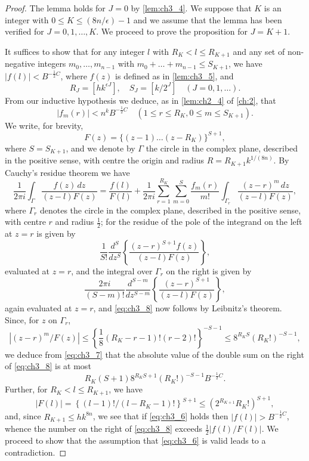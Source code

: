 \begin{proof}
The lemma holds for $J=0$ by \autoref{lem:ch3_4}. We suppose that $K$ is an integer with $0 \le K \le (8n/\epsilon) - 1$ and we assume that the lemma has been verified for $J=0,1,\dots,K$. We proceed to prove the proposition for $J=K+1$.

It suffices to show that for any integer $l$ with $R_K < l \le R_{K+1}$ and any set of non-negative integers $m_0, \dots, m_{n-1}$ with $m_0 + \dots + m_{n-1} \le S_{K+1}$, we have $|f(l)| < B^{-\frac{1}{2}C}$, where $f(z)$ is defined as in \autoref{lem:ch3_5}, and
\[
R_J = \left[hk^{\epsilon J}\right], \quad S_J = \left[k/2^J\right] \quad (J = 0, 1, \dots).
\]
From our inductive hypothesis we deduce, as in \autoref{lem:ch2_4} of \autoref{ch:2}, that
\begin{equation} \label{eq:ch3_7}\tag{7}
|f_m(r)| < n^k B^{-\frac{1}{2}C} \quad (1 \le r \le R_K, 0 \le m \le S_{K+1}).
\end{equation}
We write, for brevity,
\[
F(z) = \{(z-1) \dots (z-R_K)\}^{S+1},
\]
where $S = S_{K+1}$, and we denote by $\Gamma$ the circle in the complex plane, described in the positive sense, with centre the origin and radius $R = R_{K+1} k^{1/(8n)}$. By Cauchy's residue theorem we have
\begin{equation} \label{eq:ch3_8}\tag{8}
\frac{1}{2\pi i} \int_{\Gamma} \frac{f(z) \, dz}{(z-l) F(z)} = \frac{f(l)}{F(l)} + \frac{1}{2\pi i} \sum_{r=1}^{R_K} \sum_{m=0}^{S} \frac{f_m(r)}{m!} \int_{\Gamma_r} \frac{(z-r)^m \, dz}{(z-l) F(z)},
\end{equation}
where $\Gamma_r$ denotes the circle in the complex plane, described in the positive sense, with centre $r$ and radius $\frac{1}{2}$; for the residue of the pole of the integrand on the left at $z=r$ is given by
\[
\frac{1}{S!} \frac{d^S}{dz^S} \left\{ \frac{(z-r)^{S+1} f(z)}{(z-l) F(z)} \right\},
\]
evaluated at $z = r$, and the integral over $\Gamma_r$ on the right is given by
\[
\frac{2\pi i}{(S-m)!} \frac{d^{S-m}}{dz^{S-m}} \left\{ \frac{(z-r)^{S+1}}{(z-l)F(z)} \right\},
\]
again evaluated at $z = r$, and \eqref{eq:ch3_8} now follows by Leibnitz's theorem. Since, for $z$ on $\Gamma_r$,
\[
\left|(z-r)^m/F(z)\right| \le \left\{\frac{1}{8}(R_K-r-1)! (r-2)!\right\}^{-S-1} \le 8^{R_K S} (R_K!)^{-S-1},
\]
we deduce from \eqref{eq:ch3_7} that the absolute value of the double sum on the right of \eqref{eq:ch3_8} is at most
\[
R_K (S+1) 8^{R_K S+1} (R_K!)^{-S-1} B^{-\frac{1}{2}C}.
\]
Further, for $R_K < l \le R_{K+1}$, we have
\[
|F(l)| = \left\{ (l-1)! / (l-R_K-1)! \right\}^{S+1} \le (2^{R_{K+1}} R_K!)^{S+1},
\]
and, since $R_{K+1} \le hk^{8n}$, we see that if \eqref{eq:ch3_6} holds then $|f(l)| > B^{-\frac{1}{2}C}$, whence the number on the right of \eqref{eq:ch3_8} exceeds $\frac{1}{2}|f(l)/F(l)|$. We proceed to show that the assumption that \eqref{eq:ch3_6} is valid leads to a contradiction.


\end{proof}
